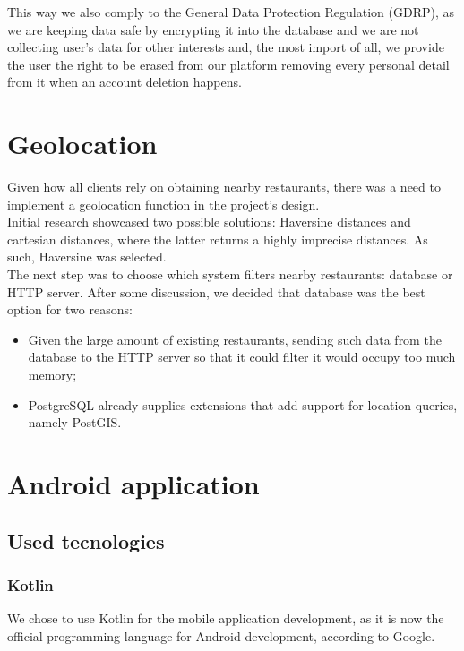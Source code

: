 This way we also comply to the General Data Protection Regulation (GDRP), as we are keeping data safe by encrypting it into the database and
we are not collecting user's data for other interests and, the most import of all, we provide the user the right to be erased from our 
platform removing every personal detail from it when an account deletion happens.\\

\section{Geolocation}

Given how all clients rely on obtaining nearby restaurants, there was a need to implement a geolocation function in the project's design.\\

Initial research showcased two possible solutions: Haversine\cite{haversine} distances and cartesian distances, where the latter returns a highly imprecise distances.
As such, Haversine was selected.\\

The next step was to choose which system filters nearby restaurants: database or HTTP server. After some discussion, we decided that database was the best
option for two reasons: 
\begin{itemize}
    \item Given the large amount of existing restaurants, sending such data from the database to the HTTP server so that it could filter it would occupy too much memory;
    \item PostgreSQL already supplies extensions that add support for location queries, namely PostGIS.
\end{itemize}

\section{Android application}

\subsection{Used tecnologies}

\subsubsection{Kotlin}

We chose to use Kotlin for the mobile application development, as it is now the official programming language for Android development,
according to Google.\\

